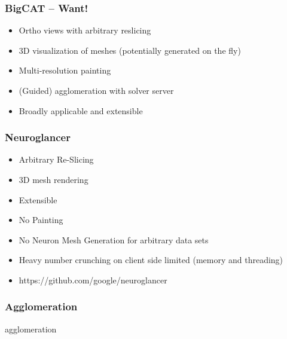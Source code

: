 \documentclass[aspectratio=169]{beamer}
\begin{document}
\begin{frame}
    \frametitle{BigCAT -- Want!}
    \begin{itemize}
          \item Ortho views with arbitrary reslicing
          \item 3D visualization of meshes (potentially generated on the fly)
          \item Multi-resolution painting
          \item (Guided) agglomeration with solver server
          \item Broadly applicable and extensible
    \end{itemize}
\end{frame} 

\begin{frame}
    \frametitle{Neuroglancer}
    \begin{itemize}
          \item Arbitrary Re-Slicing
          \item 3D mesh rendering
          \item Extensible
          \item No Painting
          \item No Neuron Mesh Generation for arbitrary data sets 
          \item Heavy number crunching on client side limited (memory and threading) 
          \item https://github.com/google/neuroglancer
    \end{itemize}
\end{frame}

\begin{frame}
    \frametitle{Agglomeration}
    {agglomeration}
\end{frame}
\end{document}
